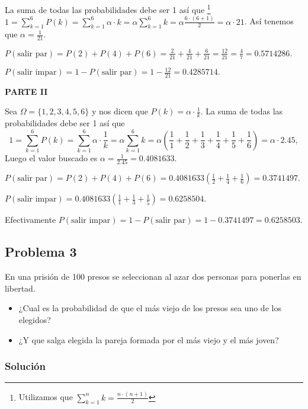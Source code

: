 \documentclass[
]{article}
\providecommand{\tightlist}{%
  \setlength{\itemsep}{0pt}\setlength{\parskip}{0pt}}
\begin{document}
La suma de todas las probabilidades debe ser 1 así que
\footnote{Utilizamos que
$\sum_{k=1}^n k=\frac{n\cdot (n+1)}{2}$ }
\(1=\sum_{k=1}^6 P(k)=\sum_{k=1}^6 \alpha \cdot k= \alpha \sum_{k=1}^6 k = \alpha \frac{6\cdot (6+1)}{2}=\alpha\cdot 21\).
Así tenemos que \(\alpha=\frac{1}{21}.\)

\(P(\mbox{salir par})= P(2)+P(4)+P(6)=\frac{2}{21}+\frac{4}{21}+\frac{6}{21}=\frac{12}{21}=\frac{4}{7}=0.5714286.\)

\(P(\mbox{salir impar})= 1- P(\mbox{salir par})=1-\frac{12}{21}=0.4285714.\)

\textbf{PARTE II}

Sea \(\Omega=\{1,2,3,4,5,6\}\) y nos dicen que
\(P(k)= \alpha\cdot \frac{1}{k}\). La suma de todas las probabilidades
debe ser 1 así que \[
1=\sum_{k=1}^6 P(k)=\sum_{k=1}^6 \alpha \cdot \frac{1}{k}=
\alpha \sum_{k=1}^6 k = \alpha \left(\frac{1}{1}+\frac{1}{2}+\frac{1}{3}+\frac{1}{4}+\frac{1}{5}+\frac{1}{6}\right)=\alpha\cdot 2.45,
\] Luego el valor buscado es \(\alpha=\frac{1}{2.45}=0.4081633\).

\(P(\mbox{salir par})= P(2)+P(4)+P(6)=0.4081633\left(\frac{1}{2}+\frac{1}{4}+\frac{1}{6}\right)=0.3741497.\)

\(P(\mbox{salir impar})= 0.4081633\left(\frac{1}{1}+\frac{1}{3}+\frac{1}{5}\right)= 0.6258504.\)

Efectivamente
\(P(\mbox{salir impar})=1-P(\mbox{salir par})=1-0.3741497= 0.6258503.\)

\hypertarget{problema-3}{%
\subsection{Problema 3}\label{problema-3}}

En una prisión de 100 presos se seleccionan al azar dos personas para
ponerlas en libertad.

\begin{itemize}
\tightlist
\item
  ¿Cual es la probabilidad de que el más viejo de los presos sea uno de
  los elegidos?
\item
  ¿Y que salga elegida la pareja formada por el más viejo y el más
  joven?
\end{itemize}

\hypertarget{soluciuxf3n-3}{%
\subsubsection{Solución}\label{soluciuxf3n-3}}
\end{document}
